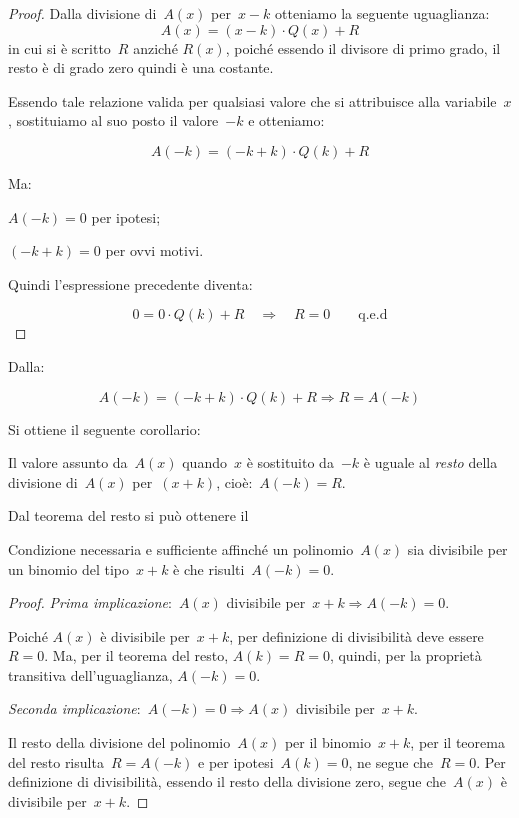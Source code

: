 \begin{proof}
 Dalla divisione di~$A(x)$ per~$x-k$ otteniamo la seguente
uguaglianza:
\[A(x)=(x-k)\cdot Q(x)+R\]
in cui si è scritto~$R$ anziché $R(x)$, poiché essendo il divisore di primo 
grado, il resto è di grado zero quindi è una costante.

Essendo tale relazione valida per qualsiasi valore che si attribuisce
alla variabile~$x$, sostituiamo al suo posto il valore~$-k$ e otteniamo:

\[A(-k)=(-k+k) \cdot Q(k)+R\]

Ma:

\begin{itemize*}
 \item $A(-k)=0$ per ipotesi;
 \item $(-k+k)=0$ per ovvi motivi.
\end{itemize*}

Quindi l'espressione precedente diventa:

\[0=0 \cdot Q(k)+R \quad \Longrightarrow \quad R=0 \qquad \text{q.e.d}\]

\end{proof}

Dalla:

\[A(-k)=(-k+k) \cdot Q(k)+R \Longrightarrow R=A(-k)\]

Si ottiene il seguente corollario:

Il valore assunto da~$A(x)$ quando~$x$ è sostituito da~$-k$
è uguale al \emph{resto} della divisione di~$A(x)$ per~$(x+k)$, 
cioè:~$A(-k)=R$.

Dal teorema del resto si può ottenere il

\begin{teorema}[di Ruffini]
Condizione necessaria e sufficiente affinché un polinomio~$A(x)$ 
sia divisibile per un binomio del tipo~$x+k$ è
che risulti~$A(-k)=0$.
\end{teorema}

\begin{proof}

\emph{Prima implicazione}:~$A(x)$ divisibile per~$x+k\Rightarrow A(-k)=0$.

Poiché $A(x)$ è divisibile per~$x+k$, per definizione di divisibilità deve 
essere~$R=0$. 
Ma, per il teorema del resto, $A(k)=R=0$, 
quindi, per la proprietà transitiva dell'uguaglianza, $A(-k)=0$.

\emph{Seconda implicazione}:~$A(-k)=0\Rightarrow A(x)$ divisibile per~$x+k$.

Il resto della divisione del polinomio~$A(x)$ per il binomio~$x+k$,
per il teorema del resto risulta~$R=A(-k)$ e per ipotesi~$A(k)=0$,
ne segue che~$R=0$. Per definizione di divisibilità, essendo il
resto della divisione zero, segue che~$A(x)$ è divisibile per~$x+k$.
\end{proof}

